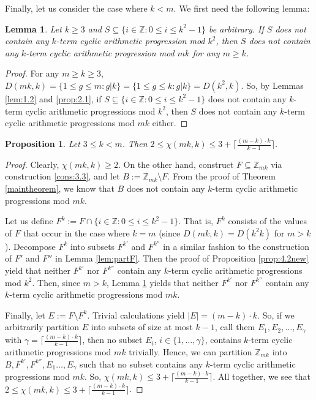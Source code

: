 \documentclass{article}
\newtheorem{lemma}[theorem]{Lemma}
\newtheorem{proposition}[theorem]{Proposition}
\theoremstyle{definition}
\theoremstyle{remark}
\begin{document}
Finally, let us consider the case where $k < m$. We first need the following lemma:

\begin{lemma}\label{lemforklessm}
    Let $k \geq 3$ and $S \subseteq \{i \in \mathbb{Z} : 0 \leq i \leq k^2-1\}$ be arbitrary. If $S$ does not contain any $k$-term cyclic arithmetic progression mod $k^2$, then $S$ does not contain any $k$-term cyclic arithmetic progression mod $mk$ for any $m \geq k$.
\end{lemma}

\begin{proof}
    For any $m \geq k \geq 3$, $D(mk,k) = \{1 \leq g \leq m : g \vert k \} = \{1 \leq g \leq k : g | k \} = D(k^2,k)$. So, by Lemmas \ref{lem:1.2} and \ref{prop:2.1}, if $S \subseteq \{i \in \mathbb{Z} : 0 \leq i \leq k^2-1\}$ does not contain any $k$-term cyclic arithmetic progressions mod $k^2$, then $S$ does not contain any $k$-term cyclic arithmetic progressions mod $mk$ either.  
\end{proof}

\begin{proposition}\label{prop:4.3new}
    Let $3 \leq k < m$. Then $2 \leq \chi(mk,k) \leq 3 + \lceil\frac{(m-k)\cdot k}{k-1}\rceil$.
\end{proposition}

\begin{proof}
    Clearly, $\chi(mk,k) \geq 2$. On the other hand, construct $F \subseteq \mathbb{Z}_{mk}$ via construction \ref{cons:3.3}, and let $B := \mathbb{Z}_{mk} \setminus F$. From the proof of Theorem \ref{maintheorem}, we know that $B$ does not contain any $k$-term cyclic arithmetic progressions mod $mk$.

    Let us define $F^k := F \cap \{i \in \mathbb{Z} : 0 \leq i \leq k^2-1\}$. That is, $F^k$ consists of the values of $F$ that occur in the case where $k = m$ (since $D(mk,k) = D(k^2k)$ for $m > k$). Decompose $F^k$ into subsets $F^{k'}$ and $F^{k''}$ in a similar fashion to the construction of $F'$ and $F''$ in Lemma \ref{lem:partF}. Then the proof of Proposition \ref{prop:4.2new} yield that neither $F^{k'}$ nor $F^{k''}$ contain any $k$-term cyclic arithmetic progressions mod $k^2$. Then, since $m > k$, Lemma \ref{lemforklessm} yields that neither $F^{k'}$ nor $F^{k''}$ contain any $k$-term cyclic arithmetic progressions mod $mk$.

    Finally, let $E := F \setminus F^k$. Trivial calculations yield $|E| = (m-k)\cdot k$. So, if we arbitrarily partition $E$ into subsets of size at most $k-1$, call them $E_1,E_2,\ldots,E_{\gamma}$ with $\gamma = \lceil\frac{(m-k)\cdot k}{k-1}\rceil$, then no subset $E_{i}$, $i \in \{1,\ldots,\gamma\}$, contains $k$-term cyclic arithmetic progressions mod $mk$ trivially. Hence, we can partition $\mathbb{Z}_{mk}$ into $B,F^{k'},F^{k''},E_{1}\ldots,E_{\gamma}$ such that no subset contains any $k$-term cyclic arithmetic progressions mod $mk$. So, $\chi(mk,k) \leq 3+\lceil\frac{(m-k)\cdot k}{k-1}\rceil$. All together, we see that $2 \leq \chi(mk,k) \leq 3+\lceil\frac{(m-k)\cdot k}{k-1}\rceil$.
\end{proof}
\end{document}
